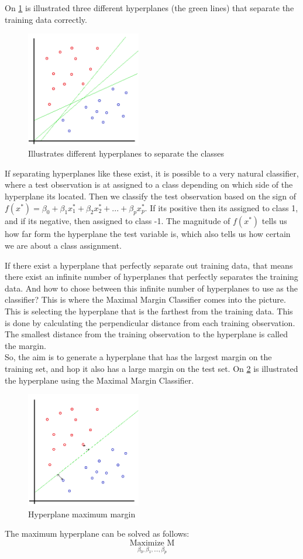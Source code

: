 On \cref{fig:Hyperplanes} is illustrated three different hyperplanes (the green lines) that separate the training data correctly. 
\begin{figure}[H]
	\centering
	\includegraphics[width=5cm]{Img/Hyperplanes.PNG}
	\caption{Illustrates different hyperplanes to separate the classes}
	\label{fig:Hyperplanes}
\end{figure} 

If separating hyperplanes like these exist, it is possible to a very natural classifier, where a test observation is at assigned to a class depending on which side of the hyperplane its located. Then we classify the test observation based on the sign of $f(x^*) = \beta_0 + \beta_1 x_1^* + \beta_2 x_2^* + ... + \beta_p x_p^*$. If its positive then its assigned to class 1, and if its negative, then assigned to class -1. The magnitude of $f(x^*)$ tells us how far form the hyperplane the test variable is, which also tells us how certain we are about a class assignment. 

If there exist a hyperplane that perfectly separate out training data, that means there exist an infinite number of hyperplanes that perfectly separates the training data. And how to chose between this infinite number of hyperplanes to use as the classifier? This is where the Maximal Margin Classifier comes into the picture. This is selecting the hyperplane that is the farthest from the training data. This is done by calculating the perpendicular distance from each training observation.  The smallest distance from the training observation to the hyperplane is called the margin. \\
So, the aim is to generate a hyperplane that has the largest margin on the training set, and hop it also has a large margin on the test set. On \cref{fig:Hyperplane_margin} is illustrated the hyperplane using the Maximal Margin Classifier.

\begin{figure}[H]
	\centering
	\includegraphics[width=5cm]{Img/Hyperplane_margin.PNG}
	\caption{Hyperplane maximum margin}
	\label{fig:Hyperplane_margin}
\end{figure} 
The maximum hyperplane can be solved as follows: 
$$\underset{\beta_0 ,\beta_1 ,...,\beta_p}{\text{Maximize M}}$$


